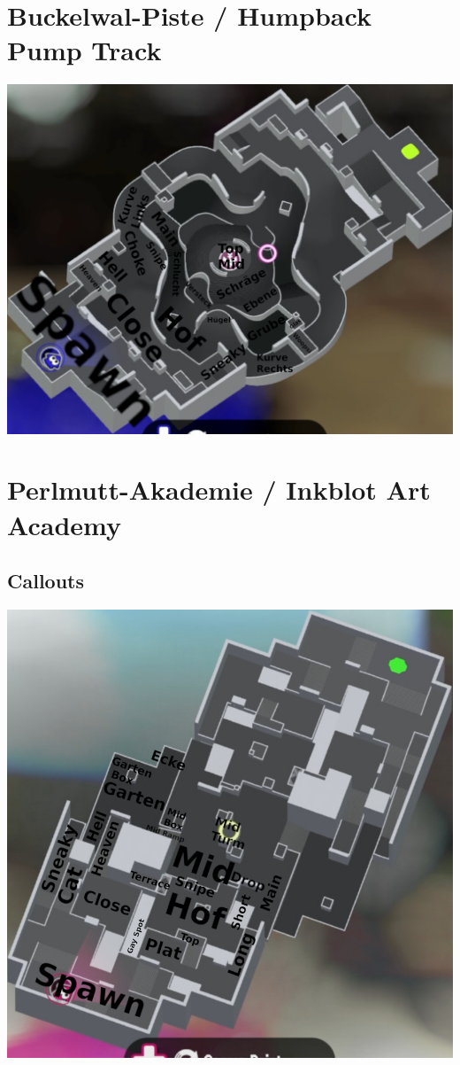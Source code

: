 \documentclass{scrreprt}
\begin{document}
\section{Buckelwal-Piste / Humpback Pump Track}
\includegraphics[width=\linewidth]{img/humpbackpumptrack.png}
\section{Perlmutt-Akademie / Inkblot Art Academy}
\subsection{Callouts}
\includegraphics[width=\linewidth]{img/inkblotartacademy.png}
\end{document}
